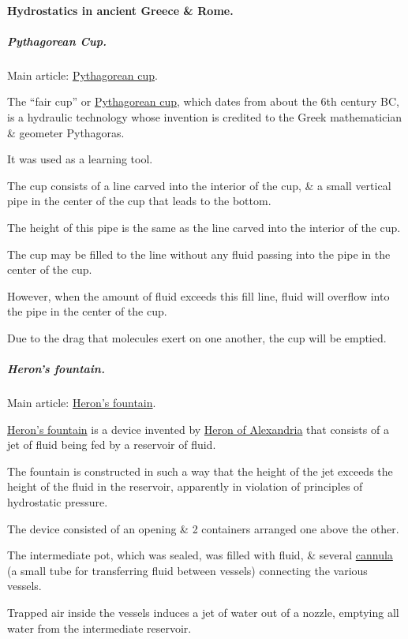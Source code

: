 \documentclass{article}
\begin{document}
\paragraph{Hydrostatics in ancient Greece \& Rome.}

\subparagraph{Pythagorean Cup.} Main article: \href{https://en.wikipedia.org/wiki/Pythagorean_cup}{Pythagorean cup}.

%
The ``fair cup'' or \href{https://en.wikipedia.org/wiki/Pythagorean_cup}{Pythagorean cup}, which dates from about the 6th century BC, is a hydraulic technology whose invention is credited to the Greek mathematician \& geometer Pythagoras.

It was used as a learning tool.

%
The cup consists of a line carved into the interior of the cup, \& a small vertical pipe in the center of the cup that leads to the bottom.

The height of this pipe is the same as the line carved into the interior of the cup.

The cup may be filled to the line without any fluid passing into the pipe in the center of the cup.

However, when the amount of fluid exceeds this fill line, fluid will overflow into the pipe in the center of the cup.

Due to the drag that molecules exert on one another, the cup will be emptied.

\subparagraph{Heron's fountain.} Main article: \href{https://en.wikipedia.org/wiki/Heron's_fountain}{Heron's fountain}.

%
\href{https://en.wikipedia.org/wiki/Heron's_fountain}{Heron's fountain} is a device invented by \href{https://en.wikipedia.org/wiki/Heron_of_Alexandria}{Heron of Alexandria} that consists of a jet of fluid being fed by a reservoir of fluid.

The fountain is constructed in such a way that the height of the jet exceeds the height of the fluid in the reservoir, apparently in violation of principles of hydrostatic pressure.

The device consisted of an opening \& 2 containers arranged one above the other.

The intermediate pot, which was sealed, was filled with fluid, \& several \href{https://en.wikipedia.org/wiki/Cannula}{cannula} (a small tube for transferring fluid between vessels) connecting the various vessels.

Trapped air inside the vessels induces a jet of water out of a nozzle, emptying all water from the intermediate reservoir. 
\end{document}
